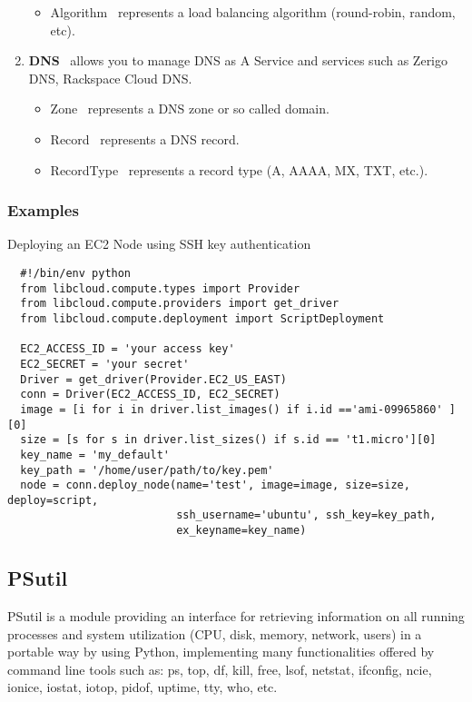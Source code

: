 \begin{enumerate}
\begin{itemize}
    \item Algorithm \textendash\ represents a load balancing algorithm (round-robin, random, etc).
  \end{itemize}
  \item {\bf DNS} \textendash\ allows you to manage DNS as A Service and services such as Zerigo DNS, Rackspace Cloud DNS.
  \begin{itemize}
    \item Zone \textendash\ represents a DNS zone or so called domain.
    \item Record \textendash\ represents a DNS record.
    \item RecordType \textendash\ represents a record type (A, AAAA, MX, TXT, etc.).
  \end{itemize}
\end{enumerate}
\subsubsection{Examples}
Deploying an EC2 Node using SSH key authentication
  \begin{verbatim}
  #!/bin/env python
  from libcloud.compute.types import Provider
  from libcloud.compute.providers import get_driver
  from libcloud.compute.deployment import ScriptDeployment

  EC2_ACCESS_ID = 'your access key'
  EC2_SECRET = 'your secret'
  Driver = get_driver(Provider.EC2_US_EAST)
  conn = Driver(EC2_ACCESS_ID, EC2_SECRET)
  image = [i for i in driver.list_images() if i.id =='ami-09965860' ][0]
  size = [s for s in driver.list_sizes() if s.id == 't1.micro'][0]
  key_name = 'my_default'
  key_path = '/home/user/path/to/key.pem'
  node = conn.deploy_node(name='test', image=image, size=size, deploy=script,
                          ssh_username='ubuntu', ssh_key=key_path,
                          ex_keyname=key_name)
  \end{verbatim}
\subsection{PSutil}
PSutil is a module providing an interface for retrieving information on all running processes and system utilization 
(CPU, disk, memory, network, users) in a portable way by using Python, implementing many functionalities offered by 
command line tools such as:
\hspace{0.5cm}ps, top, df, kill, free, lsof, netstat, ifconfig, ncie, ionice, iostat, iotop, pidof, uptime, tty, who, etc.
